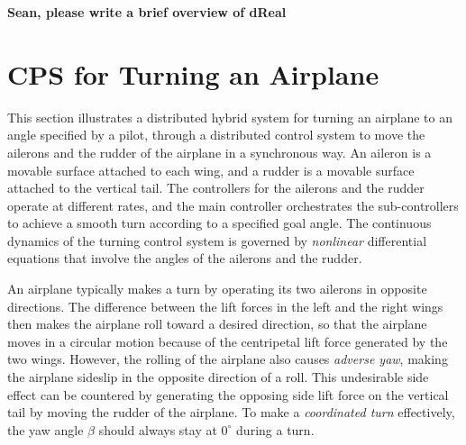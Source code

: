 \documentclass{sig-alternate}
\begin{document}
\textbf{Sean, please write a brief overview of dReal}



\section{CPS for Turning an Airplane}

This section illustrates a distributed hybrid system
for turning an airplane to an angle specified by a pilot,
through a distributed control system to move the ailerons and the rudder 
of the airplane
in a synchronous way.
An aileron is a movable surface attached to  each wing, and a rudder is a movable surface attached to the vertical tail.
%
The controllers 
for the ailerons and the rudder operate at different rates,
and the main controller orchestrates the sub-controllers 
to achieve a smooth turn
according to a specified goal angle.
%
The continuous dynamics of the turning control system
is governed by \emph{nonlinear} differential equations
that involve the angles of the ailerons and the rudder.




An airplane typically makes a turn by operating its two ailerons in opposite directions.
The difference between the lift forces in the left and the right wings
then makes the airplane roll toward a desired direction, 
so that the airplane moves in a circular motion 
because of  the centripetal lift force 
generated by the two wings.
However, the rolling of the airplane also causes
\emph{adverse yaw}, making the airplane sideslip in the opposite direction of a roll.
This undesirable side effect can be countered by 
generating the opposing side lift force on the vertical tail
by moving the rudder of the airplane.
To make a \emph{coordinated turn} effectively, the yaw angle $\beta$ should
always stay at $0^\circ$
during a turn.
\end{document}
